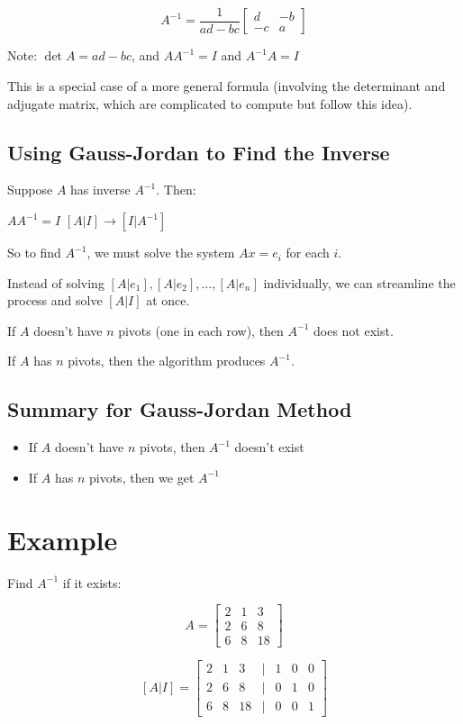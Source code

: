 \documentclass[12pt,a4paper]{article}
\begin{document}
\[
A^{-1} = \frac{1}{ad-bc} \begin{bmatrix} d & -b \\ -c & a \end{bmatrix}
\]

Note: $\det A = ad-bc$, and $AA^{-1} = I$ and $A^{-1}A = I$

This is a special case of a more general formula (involving the determinant and adjugate matrix, which are complicated to compute but follow this idea).

\subsection{Using Gauss-Jordan to Find the Inverse}

Suppose $A$ has inverse $A^{-1}$. Then:

$AA^{-1} = I$
$[A|I] \to [I|A^{-1}]$

So to find $A^{-1}$, we must solve the system $Ax = e_i$ for each $i$.

Instead of solving $[A|e_1], [A|e_2], \ldots, [A|e_n]$ individually, we can streamline the process and solve $[A|I]$ at once.

If $A$ doesn't have $n$ pivots (one in each row), then $A^{-1}$ does not exist.

If $A$ has $n$ pivots, then the algorithm produces $A^{-1}$.

\subsection{Summary for Gauss-Jordan Method}
\begin{itemize}
    \item If $A$ doesn't have $n$ pivots, then $A^{-1}$ doesn't exist
    \item If $A$ has $n$ pivots, then we get $A^{-1}$
\end{itemize}

\section{Example}

Find $A^{-1}$ if it exists:

\[
A = \begin{bmatrix} 
2 & 1 & 3 \\
2 & 6 & 8 \\
6 & 8 & 18
\end{bmatrix}
\]

\[
[A|I] = \begin{bmatrix} 
2 & 1 & 3 & | & 1 & 0 & 0 \\
2 & 6 & 8 & | & 0 & 1 & 0 \\
6 & 8 & 18 & | & 0 & 0 & 1
\end{bmatrix}
\]
\end{document}
